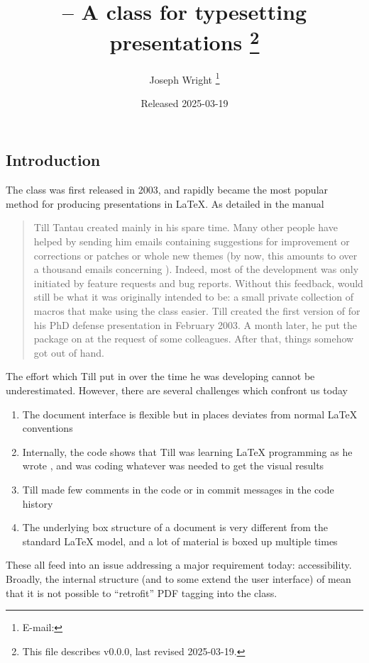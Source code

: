 \documentclass{l3doc}
\makeatletter
\let\acro\@firstofone
\def\filedate{2025-03-19}
\def\fileversion{v0.0.0}
\makeatother
\begin{document}
\title{%
   -- A class for typesetting presentations%
  \thanks{This file describes \fileversion,
    last revised \filedate.}%
}

\author{%
  Joseph Wright%
  \thanks{%
    E-mail: %
  }%
}

\date{Released \filedate}

\maketitle

\tableofcontents

\begin{documentation}

\section{Introduction%
  \label{sec:intro}}

The  class was first released in 2003, and rapidly became the
most popular method for producing presentations in \LaTeX{}. As detailed in
the  manual
\begin{quotation}
  Till Tantau created  mainly in his spare time. Many other people
  have helped by sending him emails containing suggestions for improvement or
  corrections or patches or whole new themes (by now, this amounts to over a
  thousand emails concerning ). Indeed, most of the development was
  only initiated by feature requests and bug reports. Without this feedback,
   would still be what it was originally intended to be: a small
  private collection of macros that make using the  class easier.
  Till created the first version of  for his PhD defense
  presentation in February 2003. A month later, he put the package on
  \acro{ctan} at the request of some colleagues. After that, things somehow got
  out of hand.
\end{quotation}

The effort which Till put in over the time he was developing 
cannot be underestimated. However, there are several challenges which confront
us today
\begin{enumerate}
  \item The document interface is flexible but in places deviates from normal
    \LaTeX{} conventions
  \item Internally, the code shows that Till was learning \LaTeX{} programming
    as he wrote , and was coding whatever was needed to get the
    visual results
  \item Till made few comments in the code or in commit messages in the code
    history
  \item The underlying box structure of a  document is very
    different from the standard \LaTeX{} model, and a lot of material is
    boxed up multiple times
\end{enumerate}
These all feed into an issue addressing a major requirement today:
accessibility. Broadly, the internal structure (and to some extend the user
interface) of  mean that it is not possible to \enquote{retrofit}
PDF tagging into the class.


\end{documentation}
\end{document}
